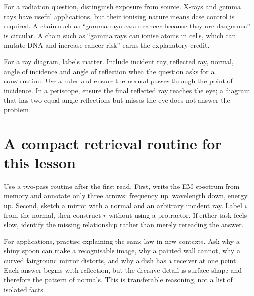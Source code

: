 \documentclass[10pt,a4paper]{article}
\begin{document}
For a radiation question, distinguish exposure from source. X-rays and gamma rays have useful applications, but their ionising nature means dose control is required. A chain such as ``gamma rays cause cancer because they are dangerous'' is circular. A chain such as ``gamma rays can ionise atoms in cells, which can mutate DNA and increase cancer risk'' earns the explanatory credit.

For a ray diagram, labels matter. Include incident ray, reflected ray, normal, angle of incidence and angle of reflection when the question asks for a construction. Use a ruler and ensure the normal passes through the point of incidence. In a periscope, ensure the final reflected ray reaches the eye; a diagram that has two equal-angle reflections but misses the eye does not answer the problem.

\section{A compact retrieval routine for this lesson}
Use a two-pass routine after the first read. First, write the EM spectrum from memory and annotate only three arrows: frequency up, wavelength down, energy up. Second, sketch a mirror with a normal and an arbitrary incident ray. Label $i$ from the normal, then construct $r$ without using a protractor. If either task feels slow, identify the missing relationship rather than merely rereading the answer.

For applications, practise explaining the same law in new contexts. Ask why a shiny spoon can make a recognisable image, why a painted wall cannot, why a curved fairground mirror distorts, and why a dish has a receiver at one point. Each answer begins with reflection, but the decisive detail is surface shape and therefore the pattern of normals. This is transferable reasoning, not a list of isolated facts.
\end{document}
